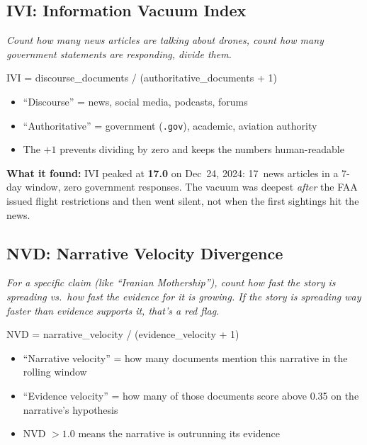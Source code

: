 \documentclass[11pt, letterpaper]{article}
\newcommand{\method}[1]{\textbf{\textcolor{accent}{#1}}}
\newcommand{\eli}[1]{\textit{\small #1}}
\begin{document}
\subsection{\method{IVI}: Information Vacuum Index}

\eli{Count how many news articles are talking about drones, count how many government statements are responding, divide them.}

\begin{code}
IVI = discourse_documents / (authoritative_documents + 1)
\end{code}

\begin{itemize}[nosep]
  \item ``Discourse'' = news, social media, podcasts, forums
  \item ``Authoritative'' = government (\texttt{.gov}), academic, aviation authority
  \item The $+1$ prevents dividing by zero and keeps the numbers human-readable
\end{itemize}

\textbf{What it found:} IVI peaked at \textbf{17.0} on Dec~24, 2024: 17~news articles in a 7-day window, zero government responses.
The vacuum was deepest \emph{after} the FAA issued flight restrictions and then went silent, not when the first sightings hit the news.

\subsection{\method{NVD}: Narrative Velocity Divergence}

\eli{For a specific claim (like ``Iranian Mothership''), count how fast the story is spreading vs.\ how fast the evidence for it is growing.
If the story is spreading way faster than evidence supports it, that's a red flag.}

\begin{code}
NVD = narrative_velocity / (evidence_velocity + 1)
\end{code}

\begin{itemize}[nosep]
  \item ``Narrative velocity'' = how many documents mention this narrative in the rolling window
  \item ``Evidence velocity'' = how many of those documents score above 0.35 on the narrative's hypothesis
  \item NVD $> 1.0$ means the narrative is outrunning its evidence
\end{itemize}
\end{document}
